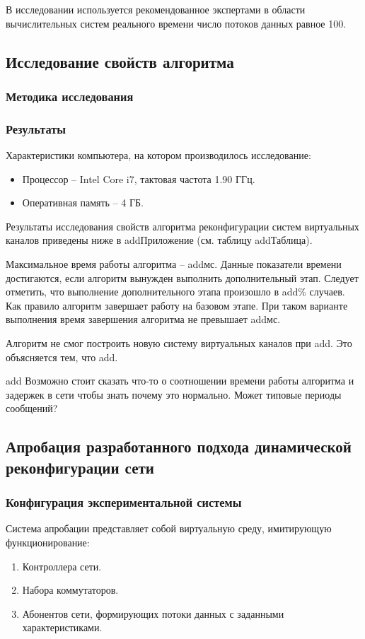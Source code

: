 \documentclass[12pt,fleqn]{article}
\begin{document}
В исследовании используется рекомендованное экспертами в области вычислительных систем реального времени число потоков данных равное 100.

\subsection{Исследование свойств алгоритма}
\subsubsection{Методика исследования}

\subsubsection{Результаты}
Характеристики компьютера, на котором производилось исследование:
\begin{itemize}
	\item Процессор -- Intel Core i7, тактовая частота 1.90 ГГц.
	\item Оперативная память -- 4 ГБ.
\end{itemize}

Результаты исследования свойств алгоритма реконфигурации систем виртуальных каналов приведены ниже в addПриложение (см. таблицу addТаблица).

Максимальное время работы алгоритма – addмс. Данные показатели времени достигаются, если алгоритм вынужден выполнить дополнительный этап. Следует отметить, что выполнение дополнительного этапа произошло в add\% случаев. Как правило алгоритм завершает работу на базовом этапе. При таком варианте выполнения время завершения алгоритма не превышает addмс.

Алгоритм не смог построить новую систему виртуальных каналов при add. Это объясняется тем, что add.

add Возможно стоит сказать что-то о соотношении времени работы алгоритма и задержек в сети чтобы знать почему это нормально. Может типовые периоды сообщений?

\subsection{Апробация разработанного подхода динамической реконфигурации сети}
\subsubsection{Конфигурация экспериментальной системы}
Система апробации представляет собой виртуальную среду, имитирующую
функционирование:
\begin{enumerate}
	\item Контроллера сети.
	\item Набора коммутаторов.
	\item Абонентов сети, формирующих потоки данных с заданными характеристиками.
\end{enumerate}
\end{document}
